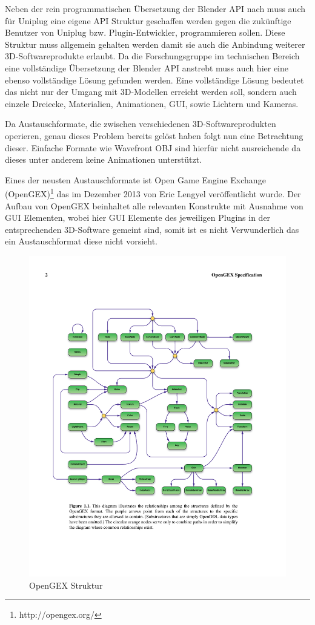  \label{sec:logi}

Neben der rein programmatischen Übersetzung der Blender API nach \CS muss auch für Uniplug eine eigene API Struktur geschaffen werden gegen die zukünftige Benutzer von Uniplug bzw. Plugin-Entwickler, programmieren sollen. Diese Struktur muss allgemein gehalten werden damit sie auch die Anbindung weiterer 3D-Softwareprodukte erlaubt. Da die Forschungsgruppe im technischen Bereich eine vollständige Übersetzung der Blender API anstrebt muss auch hier eine ebenso vollständige Lösung gefunden werden. Eine vollständige Lösung bedeutet das nicht nur der Umgang mit 3D-Modellen erreicht werden soll, sondern auch einzele Dreiecke, Materialien, Animationen, GUI, sowie Lichtern und Kameras.

Da Austauschformate, die zwischen verschiedenen 3D-Softwareprodukten operieren, genau dieses Problem bereits gelöst haben folgt nun eine Betrachtung dieser. Einfache Formate wie Wavefront OBJ sind hierfür nicht ausreichende da dieses unter anderem keine Animationen unterstützt.

Eines der neusten Austauschformate ist Open Game Engine Exchange (OpenGEX)\footnote{http://opengex.org/} das im Dezember 2013 von Eric Lengyel veröffentlicht wurde. Der Aufbau von OpenGEX beinhaltet alle relevanten Konstrukte mit Ausnahme von GUI Elementen, wobei hier GUI Elemente des jeweiligen Plugins in der entsprechenden 3D-Software gemeint sind, somit ist es nicht Verwunderlich das ein Austauschformat diese nicht vorsieht.

\begin{figure}[htbp]
\center
\includegraphics[width=1\textwidth]{images/opengexstruktur}
\caption{OpenGEX Struktur}
\label{fig:opengexstruktur}
\end{figure}